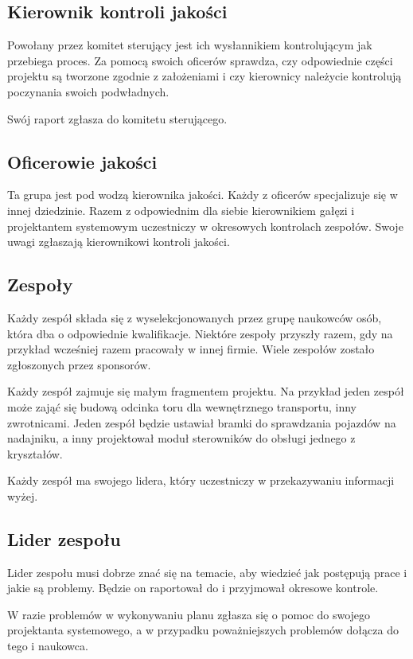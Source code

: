 \subsection{Kierownik kontroli jakości}
Powołany przez komitet sterujący jest ich wysłannikiem kontrolującym jak przebiega proces.
Za pomocą swoich oficerów sprawdza, czy odpowiednie części projektu są tworzone zgodnie z założeniami i czy kierownicy należycie kontrolują poczynania swoich podwładnych.

Swój raport zgłasza do komitetu sterującego.

\subsection{Oficerowie jakości}
Ta grupa jest pod wodzą kierownika jakości.
Każdy z oficerów specjalizuje się w innej dziedzinie.
Razem z odpowiednim dla siebie kierownikiem gałęzi i projektantem systemowym uczestniczy w okresowych kontrolach zespołów.
Swoje uwagi zgłaszają kierownikowi kontroli jakości.

\subsection{Zespoły}
Każdy zespół składa się z wyselekcjonowanych przez grupę naukowców osób, która dba o odpowiednie kwalifikacje.
Niektóre zespoły przyszły razem, gdy na przykład wcześniej razem pracowały w innej firmie.
Wiele zespołów zostało zgłoszonych przez sponsorów.

Każdy zespół zajmuje się małym fragmentem projektu. Na przykład jeden zespół może zająć się budową odcinka toru dla wewnętrznego transportu, inny zwrotnicami.
Jeden zespół będzie ustawiał bramki do sprawdzania pojazdów na nadajniku, a inny projektował moduł sterowników do obsługi jednego z kryształów.

Każdy zespół ma swojego lidera, który uczestniczy w przekazywaniu informacji wyżej.

\subsection{Lider zespołu}
Lider zespołu musi dobrze znać się na temacie, aby wiedzieć jak postępują prace i jakie są problemy. 
Będzie on raportował do i przyjmował okresowe kontrole.

W razie problemów w wykonywaniu planu zgłasza się o pomoc do swojego projektanta systemowego, a w przypadku poważniejszych problemów dołącza do tego i naukowca.

